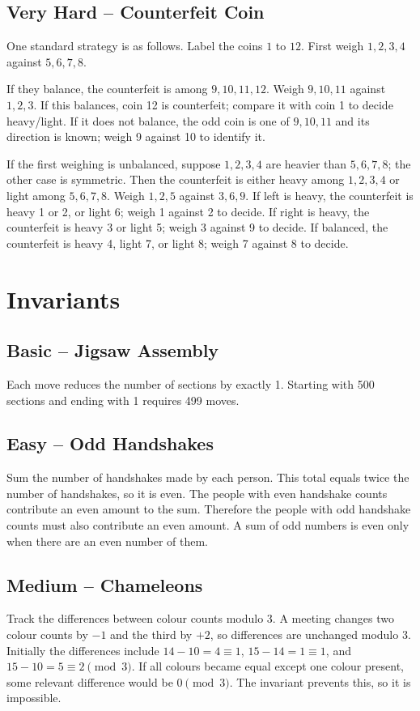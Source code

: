 \documentclass[12pt]{article}
\begin{document}
\subsection*{Very Hard -- Counterfeit Coin}
One standard strategy is as follows. Label the coins $1$ to $12$.
First weigh $1,2,3,4$ against $5,6,7,8$.

If they balance, the counterfeit is among $9,10,11,12$. Weigh
$9,10,11$ against $1,2,3$. If this balances, coin 12 is counterfeit;
compare it with coin 1 to decide heavy/light. If it does not balance,
the odd coin is one of $9,10,11$ and its direction is known; weigh 9
against 10 to identify it.

If the first weighing is unbalanced, suppose $1,2,3,4$ are heavier
than $5,6,7,8$; the other case is symmetric. Then the counterfeit is
either heavy among $1,2,3,4$ or light among $5,6,7,8$. Weigh $1,2,5$
against $3,6,9$. If left is heavy, the counterfeit is heavy 1 or 2,
or light 6; weigh 1 against 2 to decide. If right is heavy, the
counterfeit is heavy 3 or light 5; weigh 3 against 9 to decide. If
balanced, the counterfeit is heavy 4, light 7, or light 8; weigh 7
against 8 to decide.

\section{Invariants}

\subsection*{Basic -- Jigsaw Assembly}
Each move reduces the number of sections by exactly 1. Starting with
500 sections and ending with 1 requires 499 moves.

\subsection*{Easy -- Odd Handshakes}
Sum the number of handshakes made by each person. This total equals
twice the number of handshakes, so it is even. The people with even
handshake counts contribute an even amount to the sum. Therefore the
people with odd handshake counts must also contribute an even amount.
A sum of odd numbers is even only when there are an even number of them.

\subsection*{Medium -- Chameleons}
Track the differences between colour counts modulo 3. A meeting
changes two colour counts by $-1$ and the third by $+2$, so
differences are unchanged modulo 3. Initially the differences include
$14-10=4\equiv1$, $15-14=1\equiv1$, and $15-10=5\equiv2\pmod3$. If
all colours became equal except one colour present, some relevant
difference would be $0\pmod3$. The invariant prevents this, so it is impossible.
\end{document}
